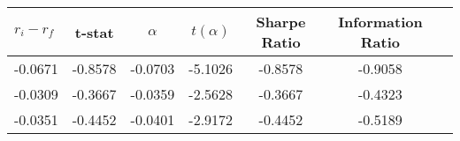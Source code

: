 \begin{tabular}{lcccccc}
\toprule
$r_i - r_f$ & t-stat & $\alpha$ & $t(\alpha)$ & Sharpe Ratio & Information Ratio \\
\midrule
-0.0671 & -0.8578 & -0.0703 & -5.1026 & -0.8578 & -0.9058 \\
-0.0309 & -0.3667 & -0.0359 & -2.5628 & -0.3667 & -0.4323 \\
-0.0351 & -0.4452 & -0.0401 & -2.9172 & -0.4452 & -0.5189 \\
\bottomrule
\end{tabular}
